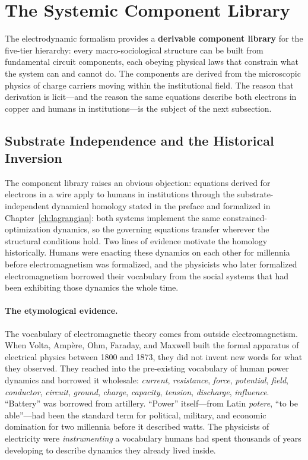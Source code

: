 \section{The Systemic Component Library}
\label{sec:component_library}

The electrodynamic formalism provides a \textbf{derivable component library} for the five-tier hierarchy: every macro-sociological structure can be built from fundamental circuit components, each obeying physical laws that constrain what the system can and cannot do. The components are derived from the microscopic physics of charge
carriers moving within the institutional field. The reason that derivation
is licit---and the reason the same equations describe both electrons in
copper and humans in institutions---is the subject of the next subsection.

\subsection{Substrate Independence and the Historical Inversion}
\label{subsec:substrate_independence}

The component library raises an obvious objection: equations
derived for electrons in a wire apply to humans in institutions through the
substrate-independent dynamical homology stated in the preface and formalized
in Chapter~\ref{ch:lagrangian}: both systems implement the same
constrained-optimization dynamics, so the governing equations transfer
wherever the structural conditions hold. Two lines of evidence motivate the
homology historically. Humans were enacting these dynamics on each other for
millennia before electromagnetism was formalized, and the physicists who later
formalized electromagnetism borrowed their vocabulary from the social systems
that had been exhibiting those dynamics the whole time.

\paragraph{The etymological evidence.}
The vocabulary of electromagnetic theory comes from outside
electromagnetism. When Volta, Amp\`ere, Ohm, Faraday, and Maxwell built
the formal apparatus of electrical physics between 1800 and 1873, they did
not invent new words for what they observed. They reached into the
pre-existing vocabulary of human power dynamics and borrowed it
wholesale: \textit{current}, \textit{resistance}, \textit{force},
\textit{potential}, \textit{field}, \textit{conductor},
\textit{circuit}, \textit{ground}, \textit{charge}, \textit{capacity},
\textit{tension}, \textit{discharge}, \textit{influence}. ``Battery''
was borrowed from artillery. ``Power'' itself---from Latin
\textit{potere}, ``to be able''---had been the standard term for
political, military, and economic domination for two millennia before it
described watts. The physicists of electricity were \textit{instrumenting} a vocabulary humans had spent thousands of years developing to describe dynamics they already lived inside.

